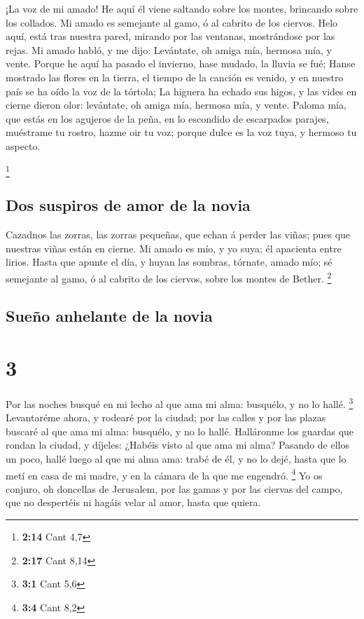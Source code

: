  ¡La voz de mi amado! He aquí él viene saltando sobre los
montes, brincando sobre los collados.  Mi amado es
semejante al gamo, ó al cabrito de los ciervos. Helo aquí, está tras
nuestra pared, mirando por las ventanas, mostrándose por las rejas.
 Mi amado habló, y me dijo: Levántate, oh amiga mía,
hermosa mía, y vente.  Porque he aquí ha pasado el
invierno, hase mudado, la lluvia se fué;  Hanse mostrado
las flores en la tierra, el tiempo de la canción es venido, y en nuestro
país se ha oído la voz de la tórtola;  La higuera ha
echado sus higos, y las vides en cierne dieron olor: levántate, oh amiga
mía, hermosa mía, y vente.  Paloma mía, que estás en los
agujeros de la peña, en lo escondido de escarpados parajes, muéstrame tu
rostro, hazme oir tu voz; porque dulce es la voz tuya, y hermoso tu
aspecto.

\footnote{\textbf{2:14} Cant 4,7}

\hypertarget{dos-suspiros-de-amor-de-la-novia}{%
\subsection{Dos suspiros de amor de la
novia}\label{dos-suspiros-de-amor-de-la-novia}}

 Cazadnos las zorras, las zorras pequeñas, que echan á
perder las viñas; pues que nuestras viñas están en cierne.
 Mi amado es mío, y yo suya; él apacienta entre lirios.
 Hasta que apunte el día, y huyan las sombras, tórnate,
amado mío; sé semejante al gamo, ó al cabrito de los ciervos, sobre los
montes de Bether. \footnote{\textbf{2:17} Cant 8,14}

\hypertarget{sueuxf1o-anhelante-de-la-novia}{%
\subsection{Sueño anhelante de la
novia}\label{sueuxf1o-anhelante-de-la-novia}}

\hypertarget{section-2}{%
\section{3}\label{section-2}}

 Por las noches busqué en mi lecho al que ama mi alma:
busquélo, y no lo hallé. \footnote{\textbf{3:1} Cant 5,6} 
Levantaréme ahora, y rodearé por la ciudad; por las calles y por las
plazas buscaré al que ama mi alma: busquélo, y no lo hallé.
 Halláronme los guardas que rondan la ciudad, y díjeles:
¿Habéis visto al que ama mi alma?  Pasando de ellos un
poco, hallé luego al que mi alma ama: trabé de él, y no lo dejé, hasta
que lo metí en casa de mi madre, y en la cámara de la que me engendró.
\footnote{\textbf{3:4} Cant 8,2}  Yo os conjuro, oh
doncellas de Jerusalem, por las gamas y por las ciervas del campo, que
no despertéis ni hagáis velar al amor, hasta que quiera.

